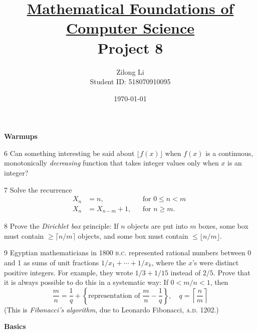 \documentclass[a4paper,12pt]{article}
\title{\small \underline{Mathematical Foundations of Computer Science}\\\Large Project 8}
\author{Zilong Li\\\small Student ID: 518070910095}
\date{\today}
\theoremstyle{definition}
\newenvironment{problems}{\begin{list}{}{\renewcommand{\makelabel}[1]{\textbf{##1}\hfil}}}{\end{list}}
\begin{document}
\maketitle

\noindent\textbf{Warmups}

\begin{problems}
    \item[6] Can something interesting be said about $\lfloor f(x)\rfloor$ when $f(x)$ is a continuous, monotonically \emph{decreasing} function that takes integer values only when $x$ is an integer?
    \item[7] Solve the recurrence
    \begin{align*}
        X_n&=n,&&\text{for }0\leq n<m\;\\
        X_n&=X_{n-m}+1,&&\text{for }n\geq m.
    \end{align*} 
    \item[8] Prove the \emph{Dirichlet box} principle:  If $n$ objects are put into $m$ boxes, some box must contain $\geq \lceil n/m\rceil$ objects, and some box must contain $\leq \lfloor n/m\rfloor$.
    \item[9] Egyptian mathematicians in 1800 \textsc{b.c.} represented rational numbers between 0 and 1 as sums of unit fractions $1/x_1+\cdots+1/x_k$, where the $x$'s were distinct positive integers.  For example, they wrote $1/3+1/15$ instead of $2/5$.  Prove that it is always possible to do this in a systematic way:  If $0 < m/n < 1$, then
    \begin{equation*}
        \frac{m}{n} =\frac{1}{q} + \left\{\text{representation of }\frac{m}{n}-\frac{1}{q}\right\},\quad q=\left\lceil\frac{n}{m}\right\rceil
    \end{equation*} 
    (This is \emph{Fibonacci's algorithm}, due to Leonardo Fibonacci, \textsc{a.d.} 1202.)
\end{problems}

\noindent\textbf{Basics}
\end{document}
